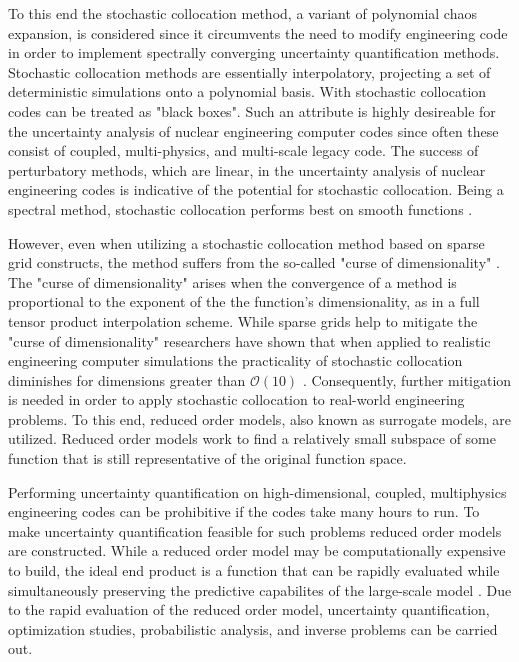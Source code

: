 To this end the stochastic collocation method, a variant of polynomial chaos expansion, is considered since it circumvents the need to modify engineering code in order to implement spectrally converging uncertainty quantification methods. Stochastic collocation methods are essentially interpolatory, projecting a set of deterministic simulations onto a polynomial basis. With stochastic collocation codes can be treated as "black boxes". Such an attribute is highly desireable for the uncertainty analysis of nuclear engineering computer codes since often these consist of coupled, multi-physics, and multi-scale legacy code. The success of perturbatory methods, which are linear, in the uncertainty analysis of nuclear engineering codes is indicative of the potential for stochastic collocation. Being a spectral method, stochastic collocation performs best on smooth functions \cite{BoydSpec}.    

However, even when utilizing a stochastic collocation method based on sparse grid constructs, the method suffers from the so-called "curse of dimensionality" \cite{LeMaitreKnio}. The "curse of dimensionality" arises when the convergence of a method is proportional to the exponent of the the function's dimensionality, as in a full tensor product interpolation scheme. While sparse grids help to mitigate the "curse of dimensionality" researchers have shown that when applied to realistic engineering computer simulations the practicality of stochastic collocation diminishes for dimensions greater than $\mathcal{O}(10)$ \cite{AHSGC_HighDimensions}. Consequently, further mitigation is needed in order to apply stochastic collocation to real-world engineering problems. To this end, reduced order models, also known as surrogate models, are utilized. Reduced order models work to find a relatively small subspace of some function that is still representative of the original function space. 

Performing uncertainty quantification on high-dimensional, coupled, multiphysics engineering codes can be prohibitive if the codes take many hours to run. To make uncertainty quantification feasible for such problems reduced order models are constructed. While a reduced order model may be computationally expensive to build, the ideal end product is a function that can be rapidly evaluated while simultaneously preserving the predictive capabilites of the large-scale model \cite{BuiThanh_Wilcox}. Due to the rapid evaluation of the reduced order model, uncertainty quantification, optimization studies, probabilistic analysis, and  inverse problems can be carried out. 

